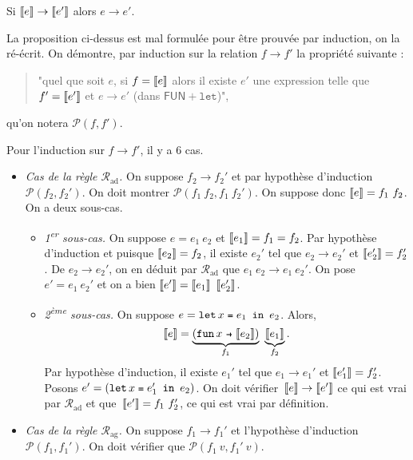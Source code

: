 \documentclass[../main]{subfiles}
\begin{document}
  \begin{prop}
    Si $\left\llbracket e\right\rrbracket \to \left\llbracket e'\right\rrbracket$ alors $e \to e'$.
  \end{prop}
  \begin{prv}
    La proposition ci-dessus est mal formulée pour être prouvée par induction, on la ré-écrit.
    On démontre, par induction sur la relation $f \to f'$ la propriété suivante :
    \begin{quote}
      "quel que soit $e$, si $f = \left\llbracket e\right\rrbracket$ alors il existe  $e'$ une expression telle que $f' = \left\llbracket e'\right\rrbracket$ et  $e \to e'$ (dans $\mathsf{FUN}+\mathtt{let}$)",
    \end{quote}
    qu'on notera $\mathcal{P}(f,f')$.

    Pour l'induction sur $f \to f'$, il y a $6$ cas.
    \begin{itemize}
      \item \textsl{Cas de la règle $\mathcal{R}_\mathrm{ad}$.}
        On suppose $f_2 \to f_2'$ et par hypothèse d'induction $\mathcal{P}(f_2,f_2')$.
        On doit montrer $\mathcal{P}(f_1\ f_2, f_1\ f_2')$.
        On suppose donc $\left\llbracket e\right\rrbracket = f_1\ f_2$.
        On a deux sous-cas.
        \begin{itemize}
          \item \textit{1\textsuperscript{er} sous-cas.}
            On suppose $e = e_1\ e_2$ et $\left\llbracket e_1\right\rrbracket = f_1 = f_2$.
            Par hypothèse d'induction et puisque $\left\llbracket e_2\right\rrbracket = f_2$, il existe $e_2'$ tel que $e_2 \to e_2'$ et $\left\llbracket e_2'\right\rrbracket = f'_2$.
            De $e_2\to e_2'$, on en déduit par $\mathcal{R}_\mathrm{ad}$ que $e_1\ e_2 \to e_1\ e_2'$.
            On pose~$e' = e_1\ e_2'$ et on a bien $\trad{e'} = \trad{e_1}\ \trad{e_2'}$.
          \item \textit{2\textsuperscript{ème} sous-cas.}
            On suppose $e = \letin x {e_1} {e_2}$.
            Alors,  \[
              \trad e = \underbrace{(\fun x {\trad{e_2}})}_{f_1}\ \underbrace{\trad{e_1}}_{f_2}
            .\]
            Par hypothèse d'induction, il existe $e_1'$ tel que $e_1 \to e_1'$ et $\left\llbracket e_1'\right\rrbracket = f_2'$.
            Posons $e' = (\letin x {e_1'} {e_2})$.
            On doit vérifier~$\left\llbracket e\right\rrbracket \to \left\llbracket e'\right\rrbracket$ ce qui est vrai par $\mathcal{R}_\mathrm{ad}$ et que~$\left\llbracket e'\right\rrbracket = f_1\ f_2'$, ce qui est vrai par définition.
        \end{itemize}
      \item \textsl{Cas de la règle $\mathcal{R}_\mathrm{ag}$.}
        On suppose $f_1 \to f_1'$ et l'hypothèse d'induction $\mathcal{P}(f_1, f_1')$.
        On doit vérifier que $\mathcal{P}(f_1\ v, f_1'\ v)$.

\end{itemize}
\end{prv}
\end{document}
